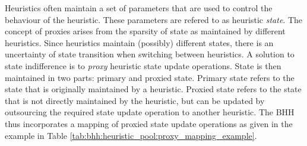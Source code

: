 \documentclass[preprint,review,12pt]{elsarticle}
\begin{document}
Heuristics often maintain a set of parameters that are used to control the behaviour of the heuristic. These parameters are refered to as heuristic \textit{state}. The concept of proxies arises from the sparsity of state as maintained by different heuristics. Since heuristics maintain (possibly) different states, there is an uncertainty of state transition when switching between heuristics. A solution to state indifference is to \textit{proxy} heuristic state update operations. State is then maintained in two parts: primary and proxied state. Primary state refers to the state that is originally maintained by a heuristic. Proxied state refers to the state that is not directly maintained by the heuristic, but can be updated by outsourcing the required state update operation to another heuristic. The \acs{BHH} thus incorporates a mapping of proxied state update operations as given in the example in Table \ref{tab:bhh:heuristic_pool:proxy_mapping_example}.
\end{document}
